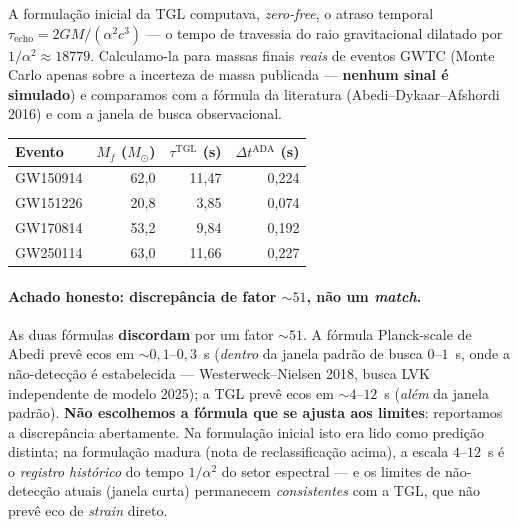 \documentclass[12pt,a4paper]{article}
\newcommand{\TGL}{\textsc{TGL}}
\begin{document}
A formulação inicial da \TGL{} computava, \emph{zero-free}, o atraso temporal
$\tau_{\text{echo}} = 2GM/(\alpha^{2}c^{3})$ --- o
tempo de travessia do raio gravitacional dilatado por $1/\alpha^{2} \approx
18779$.  Calculamo-la para massas finais
\emph{reais} de eventos GWTC (Monte Carlo apenas sobre a incerteza de massa
publicada --- \textbf{nenhum sinal é simulado}) e comparamos com a fórmula da
literatura (Abedi--Dykaar--Afshordi 2016) e com a janela de busca observacional.

\begin{center}
\begin{tabular}{l r r r}
\toprule
\textbf{Evento} & \textbf{$M_f$ ($M_\odot$)} & \textbf{$\tau^{\text{TGL}}$ (s)} & \textbf{$\Delta t^{\text{ADA}}$ (s)} \\
\midrule
GW150914 & 62{,}0 & 11{,}47 & 0{,}224 \\
GW151226 & 20{,}8 & 3{,}85 & 0{,}074 \\
GW170814 & 53{,}2 & 9{,}84 & 0{,}192 \\
GW250114 & 63{,}0 & 11{,}66 & 0{,}227 \\
\bottomrule
\end{tabular}
\end{center}

\paragraph{Achado honesto: discrepância de fator $\sim 51$, não um \emph{match}.}
As duas fórmulas \textbf{discordam} por um fator $\sim 51$.  A
fórmula Planck-scale de Abedi prevê ecos em $\sim 0{,}1$--$0{,}3$~s (\emph{dentro}
da janela padrão de busca $0$--$1$~s, onde a não-detecção é estabelecida ---
Westerweck--Nielsen 2018, busca LVK independente de modelo 2025); a \TGL{} prevê
ecos em $\sim 4$--$12$~s (\emph{além} da janela padrão).  \textbf{Não escolhemos
a fórmula que se ajusta aos limites}: reportamos a discrepância abertamente.  Na
formulação inicial isto era lido como predição distinta; na formulação madura
(nota de reclassificação acima), a escala $4$--$12$~s é o \emph{registro
histórico} do tempo $1/\alpha^{2}$ do setor espectral --- e os limites de
não-detecção atuais (janela curta) permanecem \emph{consistentes} com a \TGL{},
que não prevê eco de \emph{strain} direto.
\end{document}
